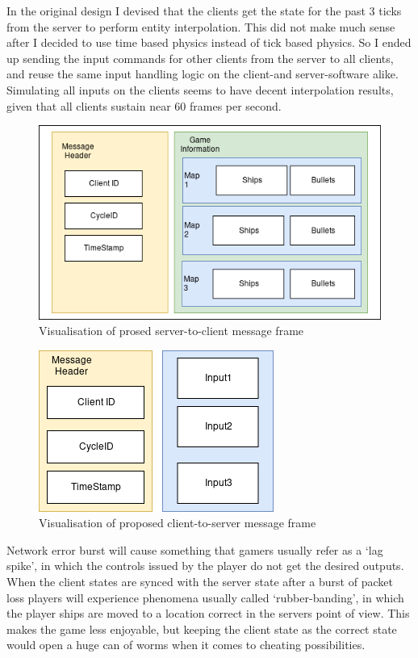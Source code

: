 \documentclass[10pt,a4paper]{article}
\begin{document}
In the original design I devised that the clients get the state for the past 3
ticks from the server to perform entity interpolation. This did not make much
sense after I decided to use time based physics instead of tick based physics.
So I ended up sending the input commands for other clients from the server to
all clients, and reuse the same input handling logic on the client-and
server-software alike.  Simulating all inputs on the clients seems to have
decent interpolation results, given that all clients sustain near 60 frames per
second.
 
 \begin{figure}
   \caption{Visualisation of prosed server-to-client message frame}
   \includegraphics[scale=0.7]{serverMessageFrame.png}
 \end{figure}

 \begin{figure}
   \caption{Visualisation of proposed client-to-server message frame}
   \includegraphics[scale=0.7]{clientMessageFrame.png}
 \end{figure}

 Network error burst will cause something that gamers usually refer as a `lag
 spike', in which the controls issued by the player do not get the desired
 outputs. When the client states are synced with the server state after a burst
 of packet loss players will experience phenomena usually called
 `rubber-banding', in which the player ships are moved to a location correct in
 the servers point of view. This makes the game less enjoyable, but keeping the
 client state as the correct state would open a huge can of worms when it comes
 to cheating possibilities. 
\end{document}
